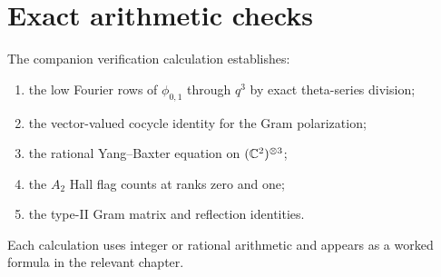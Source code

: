 \chapter{Exact arithmetic checks}
The companion verification calculation establishes:
\begin{enumerate}
\item the low Fourier rows of $\phi_{0,1}$ through $q^3$ by exact theta-series division;
\item the vector-valued cocycle identity for the Gram polarization;
\item the rational Yang--Baxter equation on $(\mathbb C^2)^{\otimes3}$;
\item the $A_2$ Hall flag counts at ranks zero and one;
\item the type-II Gram matrix and reflection identities.
\end{enumerate}
Each calculation uses integer or rational arithmetic and appears as a worked formula in the relevant chapter.
